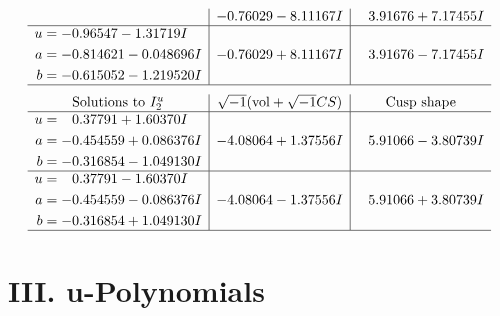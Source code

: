 \documentclass[1p]{elsarticle_modified}
\theoremstyle{definition}
\newcommand{\I}{\sqrt{-1}}
\begin{document}
$$\begin{array}{c|c|c}
 & -0.76029 - 8.11167 I & \phantom{-}3.91676 + 7.17455 I \\ \hline\begin{aligned}
u &= -0.96547 - 1.31719 I \\
a &= -0.814621 - 0.048696 I \\
b &= -0.615052 - 1.219520 I\end{aligned}
 & -0.76029 + 8.11167 I & \phantom{-}3.91676 - 7.17455 I\\
 \hline 
 \end{array}$$\newpage$$\begin{array}{c|c|c}  
\text{Solutions to }I^u_{2}& \I (\text{vol} + \sqrt{-1}CS) & \text{Cusp shape}\\
 \hline 
\begin{aligned}
u &= \phantom{-}0.37791 + 1.60370 I \\
a &= -0.454559 + 0.086376 I \\
b &= -0.316854 - 1.049130 I\end{aligned}
 & -4.08064 + 1.37556 I & \phantom{-}5.91066 - 3.80739 I \\ \hline\begin{aligned}
u &= \phantom{-}0.37791 - 1.60370 I \\
a &= -0.454559 - 0.086376 I \\
b &= -0.316854 + 1.049130 I\end{aligned}
 & -4.08064 - 1.37556 I & \phantom{-}5.91066 + 3.80739 I\\
 \hline 
 \end{array}$$\newpage
\newpage\renewcommand{\arraystretch}{1}
\centering \section*{ III. u-Polynomials}
\end{document}

